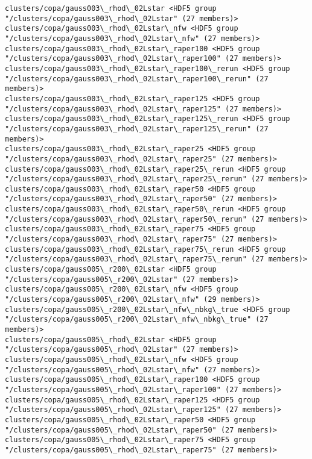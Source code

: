 \documentclass[11pt]{article}
\begin{document}
\begin{Verbatim}[commandchars=\\\{\}]
clusters/copa/gauss003\_rhod\_02Lstar <HDF5 group "/clusters/copa/gauss003\_rhod\_02Lstar" (27 members)>
clusters/copa/gauss003\_rhod\_02Lstar\_nfw <HDF5 group "/clusters/copa/gauss003\_rhod\_02Lstar\_nfw" (27 members)>
clusters/copa/gauss003\_rhod\_02Lstar\_raper100 <HDF5 group "/clusters/copa/gauss003\_rhod\_02Lstar\_raper100" (27 members)>
clusters/copa/gauss003\_rhod\_02Lstar\_raper100\_rerun <HDF5 group "/clusters/copa/gauss003\_rhod\_02Lstar\_raper100\_rerun" (27 members)>
clusters/copa/gauss003\_rhod\_02Lstar\_raper125 <HDF5 group "/clusters/copa/gauss003\_rhod\_02Lstar\_raper125" (27 members)>
clusters/copa/gauss003\_rhod\_02Lstar\_raper125\_rerun <HDF5 group "/clusters/copa/gauss003\_rhod\_02Lstar\_raper125\_rerun" (27 members)>
clusters/copa/gauss003\_rhod\_02Lstar\_raper25 <HDF5 group "/clusters/copa/gauss003\_rhod\_02Lstar\_raper25" (27 members)>
clusters/copa/gauss003\_rhod\_02Lstar\_raper25\_rerun <HDF5 group "/clusters/copa/gauss003\_rhod\_02Lstar\_raper25\_rerun" (27 members)>
clusters/copa/gauss003\_rhod\_02Lstar\_raper50 <HDF5 group "/clusters/copa/gauss003\_rhod\_02Lstar\_raper50" (27 members)>
clusters/copa/gauss003\_rhod\_02Lstar\_raper50\_rerun <HDF5 group "/clusters/copa/gauss003\_rhod\_02Lstar\_raper50\_rerun" (27 members)>
clusters/copa/gauss003\_rhod\_02Lstar\_raper75 <HDF5 group "/clusters/copa/gauss003\_rhod\_02Lstar\_raper75" (27 members)>
clusters/copa/gauss003\_rhod\_02Lstar\_raper75\_rerun <HDF5 group "/clusters/copa/gauss003\_rhod\_02Lstar\_raper75\_rerun" (27 members)>
clusters/copa/gauss005\_r200\_02Lstar <HDF5 group "/clusters/copa/gauss005\_r200\_02Lstar" (27 members)>
clusters/copa/gauss005\_r200\_02Lstar\_nfw <HDF5 group "/clusters/copa/gauss005\_r200\_02Lstar\_nfw" (29 members)>
clusters/copa/gauss005\_r200\_02Lstar\_nfw\_nbkg\_true <HDF5 group "/clusters/copa/gauss005\_r200\_02Lstar\_nfw\_nbkg\_true" (27 members)>
clusters/copa/gauss005\_rhod\_02Lstar <HDF5 group "/clusters/copa/gauss005\_rhod\_02Lstar" (27 members)>
clusters/copa/gauss005\_rhod\_02Lstar\_nfw <HDF5 group "/clusters/copa/gauss005\_rhod\_02Lstar\_nfw" (27 members)>
clusters/copa/gauss005\_rhod\_02Lstar\_raper100 <HDF5 group "/clusters/copa/gauss005\_rhod\_02Lstar\_raper100" (27 members)>
clusters/copa/gauss005\_rhod\_02Lstar\_raper125 <HDF5 group "/clusters/copa/gauss005\_rhod\_02Lstar\_raper125" (27 members)>
clusters/copa/gauss005\_rhod\_02Lstar\_raper50 <HDF5 group "/clusters/copa/gauss005\_rhod\_02Lstar\_raper50" (27 members)>
clusters/copa/gauss005\_rhod\_02Lstar\_raper75 <HDF5 group "/clusters/copa/gauss005\_rhod\_02Lstar\_raper75" (27 members)>

\end{Verbatim}
\end{document}
